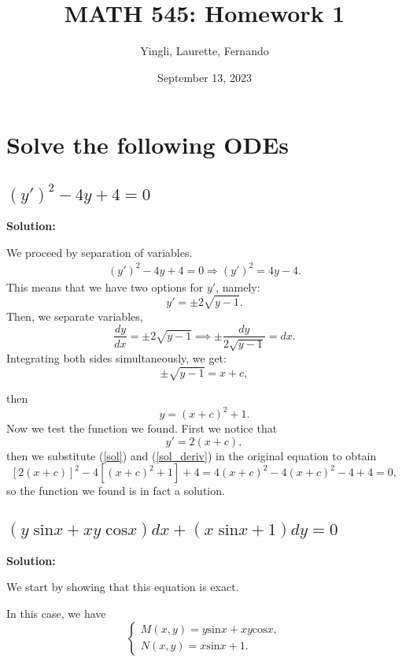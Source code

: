 \documentclass{article}
\title{MATH 545: Homework 1}
\author{Yingli, Laurette, Fernando}
\date{September 13, 2023}
\begin{document}
\maketitle
\section{Solve the following ODEs}
\subsection{$(y')^2 -4y +4 = 0$}

\textbf{Solution:}

		We proceed by separation of variables.
		\begin{align*}
			(y')^2 -4y +4 = 0 \Longrightarrow (y')^2 = 4y -4. %
		\end{align*}
		This means that we have two options for $y'$, namely:
		\[y' = \pm 2\sqrt{y-1}.\]
	Then, we separate variables,
	\[ \frac{dy}{dx} = \pm 2\sqrt{y-1} \implies \pm\frac{dy}{ 2\sqrt{y-1}} = dx.\]
		Integrating both sides simultaneously, we get:
		\[\pm \sqrt{y-1} = x+c,\]

		then
		\begin{equation} \label{sol}
			y = (x+c)^2 + 1.
		\end{equation}
		Now we test the function we found. First we notice that
		\begin{equation} \label{sol_deriv}
			y' = 2(x+c),
		\end{equation}
		then we substitute (\ref{sol}) and (\ref{sol_deriv}) in the original equation to obtain
		\[ [2(x+c)]^2 -4[(x+c)^2 + 1] +4= 4(x+c)^2 -4(x+c)^2 -4 + 4 =0,\]
		so the function we found is in fact a solution.

\subsection{$(y\;\text{sin} x + xy\;\text{cos}x)dx + (x\;\text{sin}x + 1)dy = 0$}

\textbf{Solution:}
		
		We start by showing that this equation is exact.

		In this case, we have   
		\begin{equation*}
			\begin{cases}
				M(x,y) = y\text{sin}x + xy\text{cos}x,
				\\
				N(x,y) = x\text{sin}x + 1.
			\end{cases}
		\end{equation*}
	
\end{document}

